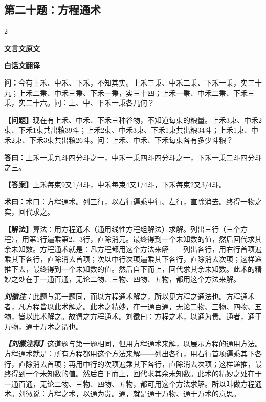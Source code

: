 \documentclass[10pt,a4paper]{article}
\newcommand{\wen}[1]{\textbf{\color{problemcolor}问：}#1\par}
\newcommand{\da}[1]{\textbf{答曰：}#1\par}
\newcommand{\shu}[1]{\textbf{术曰：}#1\par}
\newcommand{\liuhui}[1]{{\color{commentarycolor}\textit{\textbf{刘徽注：}}#1\par}}
\newcommand{\classicalheader}[1]{{\centering\large\bfseries\color{classicalcolor} #1\par\vspace{0.5em}}}
\newcommand{\wenmodern}[1]{\textbf{\color{moderncolor}【问题】}#1\par}
\newcommand{\damodern}[1]{\textbf{【答案】}#1\par}
\newcommand{\shumodern}[1]{\textbf{【解法】}#1\par}
\newcommand{\liuhuimodern}[1]{{\color{commentarycolor}\textit{\textbf{【刘徽注释】}}#1\par}}
\newcommand{\modernheader}[1]{{\centering\large\bfseries\color{moderncolor} #1\par\vspace{0.5em}}}
\newcommand{\problemsec}[1]{\subsection*{#1}}
\begin{document}
\problemsec{第二十题：方程通术}
\begin{paracol}{2}
\classicalheader{文言文原文}
\switchcolumn
\modernheader{白话文翻译}
\switchcolumn*

\wen{今有上禾、中禾、下禾，不知其实。上禾三秉、中禾二秉、下禾一秉，实三十九；上禾二秉、中禾三秉、下禾一秉，实三十四；上禾一秉、中禾二秉、下禾三秉，实二十六。问：上、中、下禾一秉各几何？}

\switchcolumn

\wenmodern{现在有上禾、中禾、下禾三种谷物，不知道每束的粮量。上禾3束、中禾2束、下禾1束共出粮39斗；上禾2束、中禾3束、下禾1束共出粮34斗；上禾1束、中禾2束、下禾3束共出粮26斗。问：上禾、中禾、下禾每束各有多少斗粮？}

\switchcolumn*

\da{上禾一秉九斗四分斗之一，中禾一秉四斗四分斗之一，下禾一秉二斗四分斗之三。}

\switchcolumn

\damodern{上禾每束9又1/4斗，中禾每束4又1/4斗，下禾每束2又3/4斗。}

\switchcolumn*

\shu{术曰：方程通术。列三行，以右行遍乘中行、左行，直除消去。终得一物之实，回代求之。}

\switchcolumn

\shumodern{算法：用方程通术（通用线性方程组解法）求解。列出三行（三个方程），用第1行遍乘第2、3行，直除消元。最终得到一个未知数的值，然后回代求其余未知数。方程通术就是：凡方程都用这个方法来解——列出各行，用右行首项遍乘其下各行，直除消去首项；次以中行次项遍乘其下各行，直除消去次项；这样递推下去，最终得到一个未知数的值。然后自下而上，回代求其余未知数。此术的精妙之处在于一通百通，无论二物、三物、四物、五物，都用这个方法来解。}

\switchcolumn*

\liuhui{此题与第一题同，而以方程通术解之，所以见方程之通法也。方程通术者，凡方程皆以此术解之。此术之精妙，在一通百通，无论二物、三物、四物、五物，皆以此术解之。故谓之方程通术。刘徽曰：方程之术，以通为贵。通者，通于万物，通于万术之谓也。}

\switchcolumn

\liuhuimodern{这道题与第一题相同，但用方程通术来解，以展示方程的通用方法。方程通术就是：所有方程都用这个方法来解——列出各行，用右行首项遍乘其下各行，直除消去首项；再用中行的次项遍乘其下各行，直除消去次项；这样递推，最终得到一个未知数的值。然后自下而上，回代求其余未知数。此术的精妙之处在于一通百通，无论二物、三物、四物、五物，都可用这个方法求解。所以叫做方程通术。刘徽说：方程之术，以通为贵。通，就是通于万物、通于万术的意思。}

\end{paracol}
\end{document}

